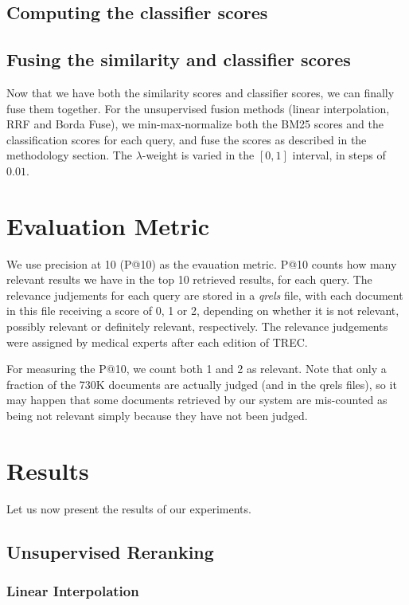 \subsection{Computing the classifier scores}


\subsection{Fusing the similarity and classifier scores}
Now that we have both the similarity scores and classifier scores, we can finally fuse them together. 
For the unsupervised fusion methods (linear interpolation, RRF and Borda Fuse), we min-max-normalize both the BM25 scores
and the classification scores for each query, and fuse the scores as described in the methodology section. The $\lambda$-weight
is varied in the $[0,1]$ interval, in steps of $0.01$.


\section{Evaluation Metric}
We use precision at 10 (P@10) as the evauation metric. P@10 counts how many relevant results we have in the top 10 retrieved results, for each query.
The relevance judjements for each query are stored in a \emph{qrels} file, with each document in this file receiving a score of 0, 1 or 2, depending on whether it
is not relevant, possibly relevant or definitely relevant, respectively. The relevance judgements were assigned by medical experts after each edition of TREC.

For measuring the P@10, we count both 1 and 2 as relevant. Note that only a
fraction of the 730K documents are actually judged (and in the qrels files), so it may happen that some documents retrieved by our system
are mis-counted as being not relevant simply because they have not been judged.


\section{Results}
Let us now present the results of our experiments.

\subsection{Unsupervised Reranking}

\subsubsection{Linear Interpolation}











